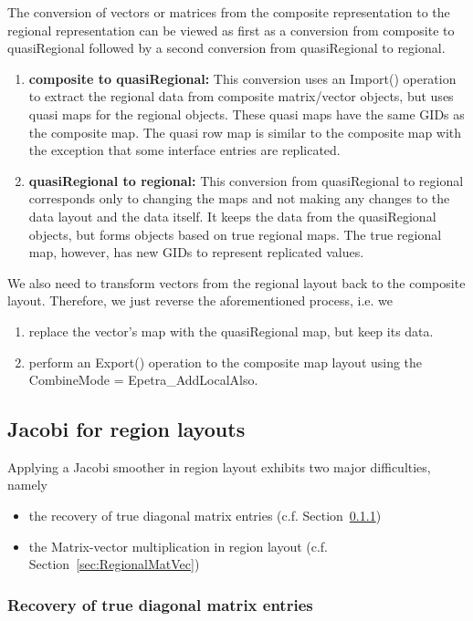 \documentclass[11pt]{article}
\begin{document}
The conversion of vectors or matrices from the
composite representation to the regional representation can be viewed as
first as a conversion from composite to quasiRegional  followed by
a second conversion from quasiRegional to regional.
\begin{enumerate}
 \item {\bf composite to quasiRegional:} This conversion uses an {\sf Import()} operation
 to extract the regional data from composite matrix/vector objects, but uses quasi maps
 for the regional objects. These quasi maps have the same GIDs
 as the composite map. The quasi row map is similar to the composite
 map with the exception that some interface entries are replicated.
 \item {\bf quasiRegional to regional:} This conversion from quasiRegional to regional corresponds
 only to changing the maps and not making any changes to the data layout and the data itself.
 It keeps the data from the quasiRegional objects,
 but forms objects based on true regional maps.
 The true regional map, however, has new GIDs to represent replicated values.
\end{enumerate}
We also need to transform vectors from the regional layout back to the composite layout. Therefore, we just reverse the aforementioned process, i.e. we
\begin{enumerate}
 \item replace the vector's map with the quasiRegional map, but keep its data.
 \item perform an {\sf Export()} operation to the composite map layout using the {\sf CombineMode = Epetra\_AddLocalAlso}.
\end{enumerate}

\subsection{Jacobi for region layouts}

Applying a Jacobi smoother in region layout exhibits two major difficulties, namely
\begin{itemize}
\item the recovery of true diagonal matrix entries (c.f. Section~\ref{sec:RecoveryTrueDiagonal})
\item the Matrix-vector multiplication in region layout (c.f. Section~\ref{sec:RegionalMatVec})
\end{itemize}

\subsubsection{Recovery of true diagonal matrix entries}
\label{sec:RecoveryTrueDiagonal}
\end{document}

